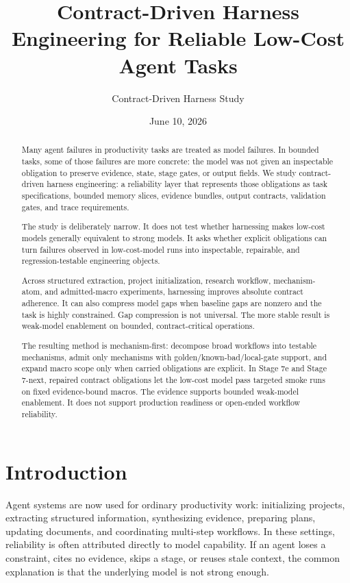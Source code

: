 \documentclass[11pt]{article}
\title{Contract-Driven Harness Engineering for Reliable Low-Cost Agent Tasks}
\author{Contract-Driven Harness Study}
\date{June 10, 2026}
\begin{document}
\maketitle

\begin{abstract}

Many agent failures in productivity tasks are treated as model failures. In bounded tasks, some of those failures are more concrete: the model was not given an inspectable obligation to preserve evidence, state, stage gates, or output fields. We study contract-driven harness engineering: a reliability layer that represents those obligations as task specifications, bounded memory slices, evidence bundles, output contracts, validation gates, and trace requirements.

The study is deliberately narrow. It does not test whether harnessing makes low-cost models generally equivalent to strong models. It asks whether explicit obligations can turn failures observed in low-cost-model runs into inspectable, repairable, and regression-testable engineering objects.

Across structured extraction, project initialization, research workflow, mechanism-atom, and admitted-macro experiments, harnessing improves absolute contract adherence. It can also compress model gaps when baseline gaps are nonzero and the task is highly constrained. Gap compression is not universal. The more stable result is weak-model enablement on bounded, contract-critical operations.

The resulting method is mechanism-first: decompose broad workflows into testable mechanisms, admit only mechanisms with golden/known-bad/local-gate support, and expand macro scope only when carried obligations are explicit. In Stage 7e and Stage 7-next, repaired contract obligations let the low-cost model pass targeted smoke runs on fixed evidence-bound macros. The evidence supports bounded weak-model enablement. It does not support production readiness or open-ended workflow reliability.

\end{abstract}

\section{Introduction}

Agent systems are now used for ordinary productivity work: initializing projects, extracting structured information, synthesizing evidence, preparing plans, updating documents, and coordinating multi-step workflows. In these settings, reliability is often attributed directly to model capability. If an agent loses a constraint, cites no evidence, skips a stage, or reuses stale context, the common explanation is that the underlying model is not strong enough.
\end{document}
